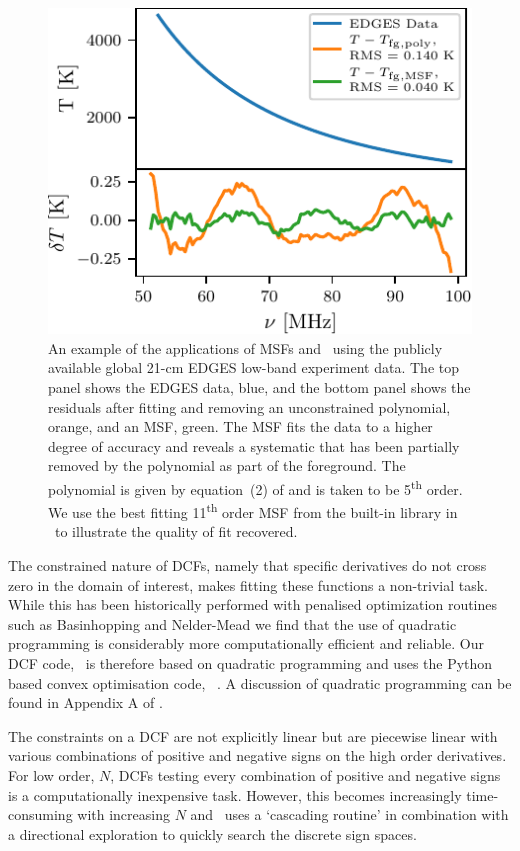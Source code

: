 \begin{figure}
    \centering
    \includegraphics{maxsmooth/figs/Figure1.pdf}
    \caption{An example of the applications of MSFs and \maxsmooth~using the publicly available global 21-cm EDGES low-band experiment data. The top panel shows the EDGES data, blue, and the bottom panel shows the residuals after fitting and removing an unconstrained polynomial, orange, and an MSF, green. The MSF fits the data to a higher degree of accuracy and reveals a systematic that has been partially removed by the polynomial as part of the foreground. The polynomial is given by equation~(2) of \protect\cite{Bowman_edges_2018} and is taken to be 5\textsuperscript{th} order. We use the best fitting 11\textsuperscript{th} order MSF from the built-in library in \maxsmooth~to illustrate the quality of fit recovered.}
    \label{fig:fig0}
\end{figure}

The constrained nature of DCFs, namely that specific derivatives do not cross zero in the domain of interest, makes fitting these functions a non-trivial task. While this has been historically performed with penalised optimization routines such as Basinhopping \citep[][]{Basinhopping} and Nelder-Mead \citep[][]{Nelder-Mead} we find that the use of quadratic programming \citep[][]{qp} is considerably more computationally efficient and reliable. Our DCF code, \maxsmooth~is therefore based on quadratic programming and uses the Python based convex optimisation code, \cvxopt~\citep[ConVeX OPTimization,][]{cvxopt}. A discussion of quadratic programming can be found in Appendix A of \cite{Bevins_maxsmooth_2021}. 

The constraints on a DCF are not explicitly linear but are piecewise linear with various combinations of positive and negative signs on the high order derivatives. For low order, $N$, DCFs testing every combination of positive and negative signs is a computationally inexpensive task. However, this becomes increasingly time-consuming with increasing $N$ and \maxsmooth~uses a `cascading routine' in combination with a directional exploration to quickly search the discrete sign spaces.

